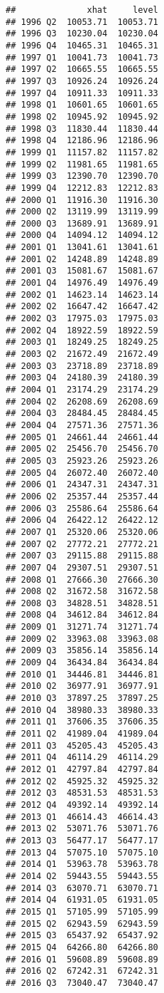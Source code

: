 \documentclass[
]{article}
\begin{document}
\begin{verbatim}
##              xhat     level
## 1996 Q2  10053.71  10053.71
## 1996 Q3  10230.04  10230.04
## 1996 Q4  10465.31  10465.31
## 1997 Q1  10041.73  10041.73
## 1997 Q2  10665.55  10665.55
## 1997 Q3  10926.24  10926.24
## 1997 Q4  10911.33  10911.33
## 1998 Q1  10601.65  10601.65
## 1998 Q2  10945.92  10945.92
## 1998 Q3  11830.44  11830.44
## 1998 Q4  12186.96  12186.96
## 1999 Q1  11157.82  11157.82
## 1999 Q2  11981.65  11981.65
## 1999 Q3  12390.70  12390.70
## 1999 Q4  12212.83  12212.83
## 2000 Q1  11916.30  11916.30
## 2000 Q2  13119.99  13119.99
## 2000 Q3  13689.91  13689.91
## 2000 Q4  14094.12  14094.12
## 2001 Q1  13041.61  13041.61
## 2001 Q2  14248.89  14248.89
## 2001 Q3  15081.67  15081.67
## 2001 Q4  14976.49  14976.49
## 2002 Q1  14623.14  14623.14
## 2002 Q2  16647.42  16647.42
## 2002 Q3  17975.03  17975.03
## 2002 Q4  18922.59  18922.59
## 2003 Q1  18249.25  18249.25
## 2003 Q2  21672.49  21672.49
## 2003 Q3  23718.89  23718.89
## 2003 Q4  24180.39  24180.39
## 2004 Q1  23174.29  23174.29
## 2004 Q2  26208.69  26208.69
## 2004 Q3  28484.45  28484.45
## 2004 Q4  27571.36  27571.36
## 2005 Q1  24661.44  24661.44
## 2005 Q2  25456.70  25456.70
## 2005 Q3  25923.26  25923.26
## 2005 Q4  26072.40  26072.40
## 2006 Q1  24347.31  24347.31
## 2006 Q2  25357.44  25357.44
## 2006 Q3  25586.64  25586.64
## 2006 Q4  26422.12  26422.12
## 2007 Q1  25320.06  25320.06
## 2007 Q2  27772.21  27772.21
## 2007 Q3  29115.88  29115.88
## 2007 Q4  29307.51  29307.51
## 2008 Q1  27666.30  27666.30
## 2008 Q2  31672.58  31672.58
## 2008 Q3  34828.51  34828.51
## 2008 Q4  34612.84  34612.84
## 2009 Q1  31271.74  31271.74
## 2009 Q2  33963.08  33963.08
## 2009 Q3  35856.14  35856.14
## 2009 Q4  36434.84  36434.84
## 2010 Q1  34446.81  34446.81
## 2010 Q2  36977.91  36977.91
## 2010 Q3  37897.25  37897.25
## 2010 Q4  38980.33  38980.33
## 2011 Q1  37606.35  37606.35
## 2011 Q2  41989.04  41989.04
## 2011 Q3  45205.43  45205.43
## 2011 Q4  46114.29  46114.29
## 2012 Q1  42797.84  42797.84
## 2012 Q2  45925.32  45925.32
## 2012 Q3  48531.53  48531.53
## 2012 Q4  49392.14  49392.14
## 2013 Q1  46614.43  46614.43
## 2013 Q2  53071.76  53071.76
## 2013 Q3  56477.17  56477.17
## 2013 Q4  57075.10  57075.10
## 2014 Q1  53963.78  53963.78
## 2014 Q2  59443.55  59443.55
## 2014 Q3  63070.71  63070.71
## 2014 Q4  61931.05  61931.05
## 2015 Q1  57105.99  57105.99
## 2015 Q2  62943.59  62943.59
## 2015 Q3  65437.92  65437.92
## 2015 Q4  64266.80  64266.80
## 2016 Q1  59608.89  59608.89
## 2016 Q2  67242.31  67242.31
## 2016 Q3  73040.47  73040.47

\end{verbatim}
\end{document}
